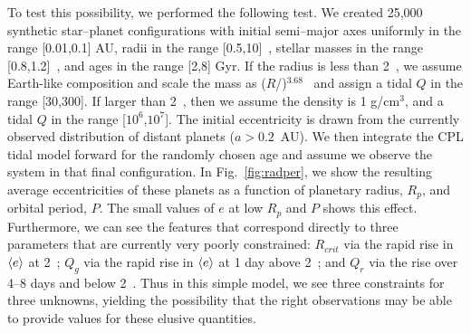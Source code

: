 To test this possibility, we performed the following test. We created
25,000 synthetic star--planet configurations with initial semi--major
axes uniformly in the range [0.01,0.1] AU, radii in the range
[0.5,10]~\rearth, stellar masses in the range [0.8,1.2]~\msun, and
ages in the range [2,8] Gyr.  If the radius is less than 2~\rearth, we
assume Earth-like composition and scale the mass as ($R$/\rearth)$^{3.68}$\mearth~\citep{Sotin07} and
assign a tidal $Q$ in the range [30,300].  If larger than 2~\rearth, then we assume
the density is 1 g/cm$^3$, and a tidal $Q$ in the range
[$10^6$,$10^7$].  The initial eccentricity is drawn from the currently
observed distribution of distant planets ($a > 0.2$~AU).  We then
integrate the CPL tidal model forward for the randomly chosen age and assume we
observe the system in that final configuration. In
Fig.~\ref{fig:radper}, we show the resulting average eccentricities of
these planets as a function of planetary radius, $R_p$, and orbital
period, $P$.  The small values of $e$ at low $R_p$ and $P$ shows this
effect.  Furthermore, we can see the features that correspond directly
to three parameters that are currently very poorly constrained:
$R_{crit}$ via the rapid rise in $\left< e \right>$ at 2~\rearth; $Q_g$ via the
rapid rise in $\left< e \right>$ at 1 day above 2~\rearth; and $Q_r$ via the
rise over 4--8 days and below 2~\rearth.  Thus in this simple model,
we see three constraints for three unknowns, yielding the possibility
that the right observations may be able to provide values for these
elusive quantities.

